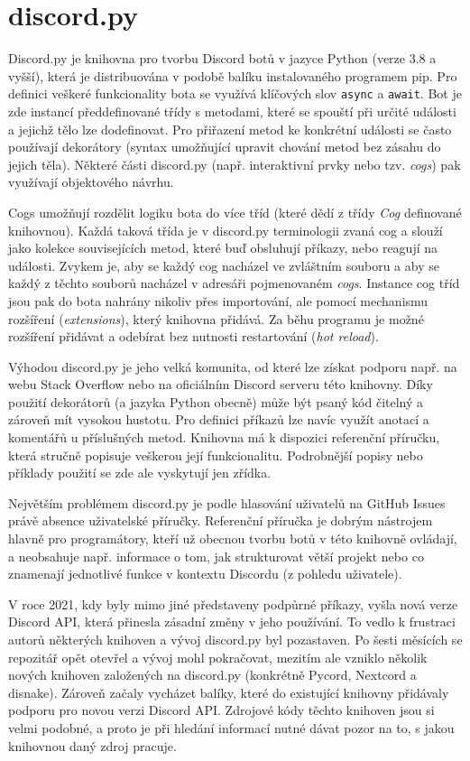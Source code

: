 \documentclass[FM]{tulthesis}
\begin{document}
	\section{discord.py}
	\label{_tag_section_discordpy}
	
	Discord.py je knihovna pro tvorbu Discord botů v jazyce Python (verze 3.8 a vyšší), která je distribuována v podobě balíku instalovaného programem pip. Pro definici veškeré funkcionality bota se využívá klíčových slov \verb*|async| a \verb*|await|. Bot je zde instancí předdefinované třídy s metodami, které se spouští při určité události a jejichž tělo lze dodefinovat. Pro přiřazení metod ke konkrétní události se často používají dekorátory (syntax umožňující upravit chování metod bez zásahu do jejich těla). Některé části discord.py (např. interaktivní prvky nebo tzv. \textit{cogs}) pak využívají objektového návrhu. 
	
	Cogs umožňují rozdělit logiku bota do více tříd (které dědí z třídy \textit{Cog} definované knihovnou). Každá taková třída je v discord.py terminologii zvaná cog a slouží jako kolekce souvisejících metod, které buď obsluhují příkazy, nebo reagují na události. Zvykem je, aby se každý cog nacházel ve zvláštním souboru a aby se každý z těchto souborů nacházel v adresáři pojmenovaném \textit{cogs}. Instance cog tříd jsou pak do bota nahrány nikoliv přes importování, ale pomocí mechanismu rozšíření (\textit{extensions}), který knihovna přidává. Za běhu programu je možné rozšíření přidávat a odebírat bez nutnosti restartování (\textit{hot reload}).
	
	Výhodou discord.py je jeho velká komunita, od které lze získat podporu např. na webu Stack Overflow nebo na oficiálním Discord serveru této knihovny. Díky použití dekorátorů (a jazyka Python obecně) může být psaný kód čitelný a zároveň mít vysokou hustotu. Pro definici příkazů lze navíc využít anotací a komentářů u příslušných metod. Knihovna má k dispozici referenční příručku, která stručně popisuje veškerou její funkcionalitu. Podrobnější popisy nebo příklady použití se zde ale vyskytují jen zřídka.
	
	Největším problémem discord.py je podle hlasování uživatelů na GitHub \mbox{Issues} právě absence uživatelské příručky. Referenční příručka je dobrým nástrojem hlavně pro programátory, kteří už obecnou tvorbu botů v této knihovně ovládají, a neobsahuje např. informace o tom, jak strukturovat větší projekt nebo co znamenají jednotlivé funkce v kontextu Discordu (z pohledu uživatele).
	
	V roce 2021, kdy byly mimo jiné představeny podpůrné příkazy, vyšla nová verze Discord API, která přinesla zásadní změny v jeho používání. To vedlo k frustraci autorů některých knihoven a vývoj discord.py byl pozastaven. Po šesti měsících se repozitář opět otevřel a vývoj mohl pokračovat, mezitím ale vzniklo několik nových knihoven založených na discord.py (konkrétně Pycord, Nextcord a disnake). Zároveň začaly vycházet balíky, které do existující knihovny přidávaly podporu pro novou verzi Discord API. Zdrojové kódy těchto knihoven jsou si velmi podobné, a proto je při hledání informací nutné dávat pozor na to, s jakou knihovnou daný zdroj pracuje.
	
\end{document}

